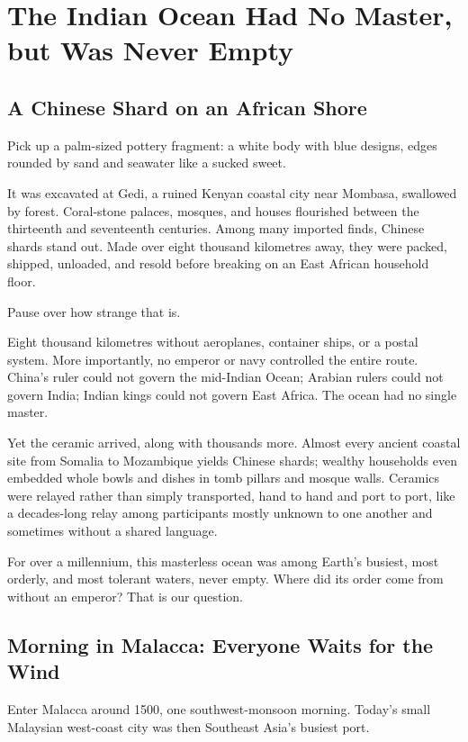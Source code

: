 \chapter[An Ocean without a Master]{The Indian Ocean Had No Master, but Was Never Empty}
\section{A Chinese Shard on an African Shore}
Pick up a palm-sized pottery fragment: a white body with blue designs, edges rounded by sand and seawater like a sucked sweet.

It was excavated at Gedi, a ruined Kenyan coastal city near Mombasa, swallowed by forest. Coral-stone palaces, mosques, and houses flourished between the thirteenth and seventeenth centuries. Among many imported finds, Chinese shards stand out. Made over eight thousand kilometres away, they were packed, shipped, unloaded, and resold before breaking on an East African household floor.

Pause over how strange that is.

Eight thousand kilometres without aeroplanes, container ships, or a postal system. More importantly, no emperor or navy controlled the entire route. China's ruler could not govern the mid-Indian Ocean; Arabian rulers could not govern India; Indian kings could not govern East Africa. The ocean had no single master.

Yet the ceramic arrived, along with thousands more. Almost every ancient coastal site from Somalia to Mozambique yields Chinese shards; wealthy households even embedded whole bowls and dishes in tomb pillars and mosque walls. Ceramics were relayed rather than simply transported, hand to hand and port to port, like a decades-long relay among participants mostly unknown to one another and sometimes without a shared language.

For over a millennium, this masterless ocean was among Earth's busiest, most orderly, and most tolerant waters, never empty. Where did its order come from without an emperor? That is our question.

\section[Malacca: Waiting for the Wind]{Morning in Malacca: Everyone Waits for the Wind}
Enter Malacca around 1500, one southwest-monsoon morning. Today's small Malaysian west-coast city was then Southeast Asia's busiest port.

